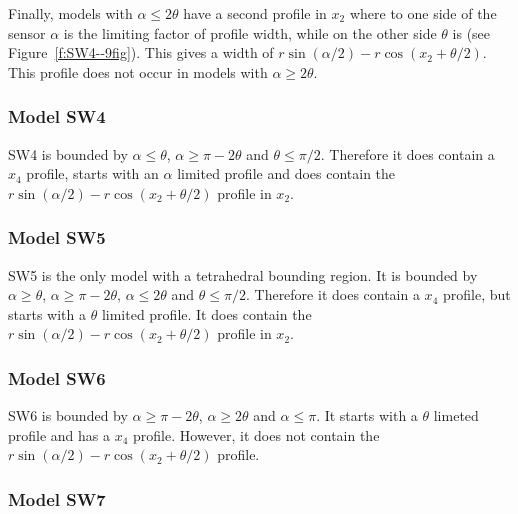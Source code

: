 Finally, models with $\alpha \le 2\theta$ have a second profile in $x_2$ where to one side of the sensor $\alpha$ is the limiting factor of profile width, while on the other side $\theta$ is (see Figure~\ref{f:SW4--9fig}). This gives a width of $r\sin(\alpha/2) - r\cos(x_2 + \theta/2)$. This profile does not occur in models with $\alpha \ge 2\theta$.

\subsubsection{Model SW4} \label{SW4}

SW4 is bounded by $\alpha \le \theta$, $\alpha \ge \pi - 2\theta$ and $\theta \le \pi/2$. Therefore it does contain a $x_4$ profile, starts with an $\alpha$ limited profile and does contain the $r\sin(\alpha/2) - r\cos(x_2 + \theta/2)$ profile in $x_2$.



\subsubsection{Model SW5} \label{SW5}

SW5 is the only model with a tetrahedral bounding region. It is bounded by $\alpha \ge \theta$, $\alpha \ge \pi - 2\theta$, $\alpha \le 2\theta$ and $\theta \le \pi/2$. Therefore it does contain a $x_4$ profile, but starts with a $\theta$ limited profile. It does contain the $r\sin(\alpha/2) - r\cos(x_2 + \theta/2)$ profile in $x_2$.



\subsubsection{Model SW6} \label{SW6}

SW6 is bounded by $\alpha \ge \pi - 2\theta$,  $\alpha \ge 2\theta$ and $\alpha \le \pi$. It starts with a $\theta$ limeted profile and has a $x_4$ profile. However, it does not contain the $r\sin(\alpha/2) - r\cos(x_2 + \theta/2)$ profile.




\subsubsection{Model SW7} \label{SW7}

